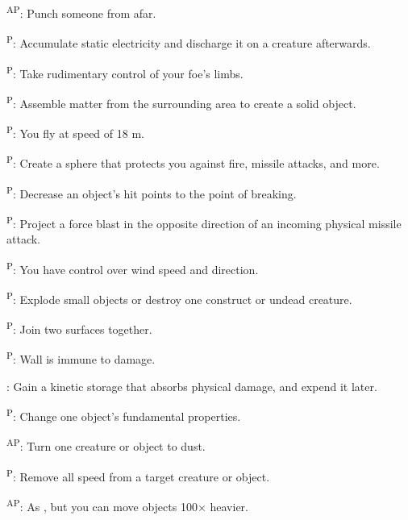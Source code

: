 \begin{enumerate*}
      \textsuperscript{AP}: Punch someone from afar.

      \textsuperscript{P}: Accumulate static electricity and discharge it on a creature afterwards.

\item {}\textsuperscript{P}: Take rudimentary control of your foe's limbs.

      \textsuperscript{P}: Assemble matter from the surrounding area to create a solid object.

      \textsuperscript{P}: You fly at speed of 18 m.

      \textsuperscript{P}: Create a sphere that protects you against fire, missile attacks, and more.

      \textsuperscript{P}: Decrease an object's hit points to the point of breaking.

      \textsuperscript{P}: Project a force blast in the opposite direction of an incoming physical missile attack.

\item {}\textsuperscript{P}: You have control over wind speed and direction.

      \textsuperscript{P}: Explode small objects or destroy one construct or undead creature.

      \textsuperscript{P}: Join two surfaces together.

      \textsuperscript{P}: Wall is immune to damage.

\item {}: Gain a kinetic storage that absorbs physical damage, and expend it later.

      \textsuperscript{P}: Change one object's fundamental properties.

\item {}\textsuperscript{AP}: Turn one creature or object to dust.

\item {}\textsuperscript{P}: Remove all speed from a target creature or object.

\item {}\textsuperscript{AP}: As , but you can move objects 100$\times$ heavier.
\end{enumerate*}



